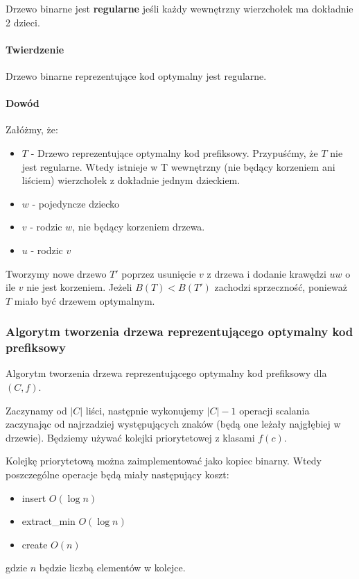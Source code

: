 Drzewo binarne jest \textbf{regularne} jeśli każdy wewnętrzny wierzchołek ma dokładnie 2 dzieci.

\paragraph{Twierdzenie}{Drzewo binarne reprezentujące kod optymalny jest regularne.}

\paragraph{Dowód\\}{}
Załóżmy, że:
\begin{itemize}
\item $T$ - Drzewo reprezentujące optymalny kod prefiksowy. Przypuśćmy, że $T$ nie jest regularne. Wtedy istnieje w T wewnętrzny (nie będący korzeniem ani liściem) wierzchołek z dokładnie jednym dzieckiem.
\item $w$ - pojedyncze dziecko
\item $v$ - rodzic $w$, nie będący korzeniem drzewa.
\item $u$ - rodzic $v$
\end{itemize}

Tworzymy nowe drzewo $T'$ poprzez usunięcie $v$ z drzewa i dodanie krawędzi $uw$ o ile $v$ nie jest korzeniem.
Jeżeli $B(T) < B(T')$ zachodzi sprzeczność, ponieważ $T$ miało być drzewem optymalnym.

\subsubsection{Algorytm tworzenia drzewa reprezentującego optymalny kod prefiksowy}
Algorytm tworzenia drzewa reprezentującego optymalny kod prefiksowy dla $(C,f)$. 

Zaczynamy od $|C|$ liści, następnie wykonujemy $|C|-1$ operacji scalania zaczynając od najrzadziej występujących znaków (będą one leżały najgłębiej w drzewie). Będziemy używać kolejki priorytetowej z klasami $f(c)$. 

Kolejkę priorytetową można zaimplementować jako kopiec binarny. Wtedy poszczególne operacje będą miały następujący koszt:
\begin{itemize}
\item insert $O(\log n)$ 
\item extract\_min $O(\log n)$
\item create $O(n)$
\end{itemize}
gdzie $n$ będzie liczbą elementów w kolejce.

